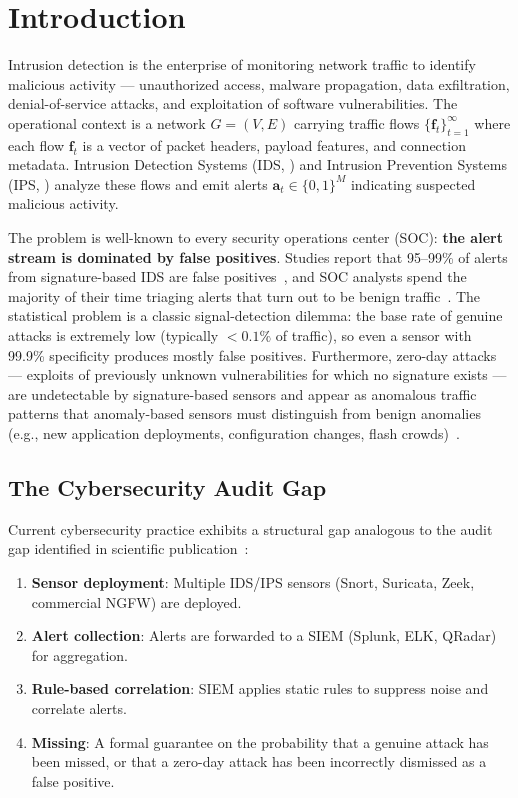 \documentclass[11pt,a4paper]{article}
\theoremstyle{definition}
\theoremstyle{remark}
\newcommand{\alertvec}{\mathbf{a}}
\newcommand{\flowvec}{\mathbf{f}}
\begin{document}
\section{Introduction  }

Intrusion detection is the enterprise of monitoring network traffic to identify malicious activity — unauthorized access, malware propagation, data exfiltration, denial-of-service attacks, and exploitation of software vulnerabilities. The operational context is a network $G = (V, E)$ carrying traffic flows $\{\flowvec_t\}_{t=1}^{\infty}$ where each flow $\flowvec_t$ is a vector of packet headers, payload features, and connection metadata. Intrusion Detection Systems (IDS, ) and Intrusion Prevention Systems (IPS, ) analyze these flows and emit alerts $\alertvec_t \in \{0, 1\}^{M}$ indicating suspected malicious activity.

The problem is well-known to every security operations center (SOC): \textbf{the alert stream is dominated by false positives}. Studies report that 95--99\% of alerts from signature-based IDS are false positives~\cite{Axelsson2000}, and SOC analysts spend the majority of their time triaging alerts that turn out to be benign traffic~\cite{Bhatt2014}. The statistical problem is a classic signal-detection dilemma: the base rate of genuine attacks is extremely low (typically $< 0.1\%$ of traffic), so even a sensor with 99.9\% specificity produces mostly false positives. Furthermore, zero-day attacks — exploits of previously unknown vulnerabilities for which no signature exists — are undetectable by signature-based sensors and appear as anomalous traffic patterns that anomaly-based sensors must distinguish from benign anomalies (e.g., new application deployments, configuration changes, flash crowds)~\cite{Bilge2012, Sommer2010}.

\subsection{The Cybersecurity Audit Gap }

Current cybersecurity practice exhibits a structural gap analogous to the audit gap identified in scientific publication~\cite{SCXManifesto2026}:

\begin{enumerate}[label=(\roman*)]
    \item \textbf{Sensor deployment}: Multiple IDS/IPS sensors (Snort, Suricata, Zeek, commercial NGFW) are deployed.
    \item \textbf{Alert collection}: Alerts are forwarded to a SIEM (Splunk, ELK, QRadar) for aggregation.
    \item \textbf{Rule-based correlation}: SIEM applies static rules to suppress noise and correlate alerts.
    \item \textbf{Missing}: A formal guarantee on the probability that a genuine attack has been missed, or that a zero-day attack has been incorrectly dismissed as a false positive.
\end{enumerate}
\end{document}
